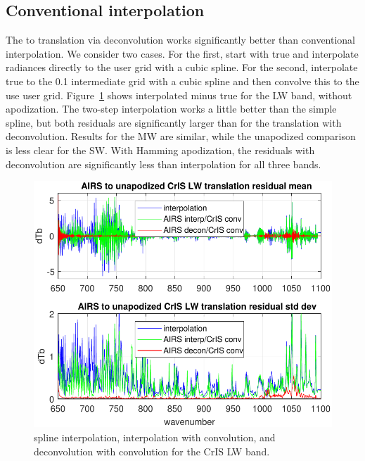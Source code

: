 \documentclass[journal]{IEEEtran}
\begin{document}
\subsection{Conventional interpolation}

The {\airs} to {\cris} translation via deconvolution works
significantly better than conventional interpolation.  We consider
two cases.  For the first, start with true {\airs} and interpolate
radiances directly to the {\cris} user grid with a cubic spline.
For the second, interpolate true {\airs} to the 0.1 {\wn}
intermediate grid with a cubic spline and then convolve this to the
use {\cris} user grid.  Figure~\ref{intpLW} shows interpolated
{\cris} minus true {\cris} for the LW band, without apodization.
The two-step interpolation works a little better than the simple
spline, but both residuals are significantly larger than for the
translation with deconvolution.  Results for the MW are similar,
while the unapodized comparison is less clear for the SW.  With
Hamming apodization, the residuals with deconvolution are
significantly less than interpolation for all three bands.

\begin{figure} %
  \centering
  \includegraphics[width=\linewidth]{figures/a2cris_interp_LW.pdf}
  \caption{spline interpolation, interpolation with convolution, 
    and deconvolution with convolution for the CrIS LW band.}
  \label{intpLW}
\end{figure}
\end{document}
